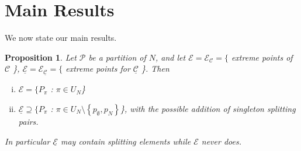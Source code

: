 \documentclass{article}
\newtheorem{prop}{Proposition}
\theoremstyle{case}
\begin{document}
\section{Main Results}
{\parindent0pt %
We now state our main results.\\
}%
\begin{prop} \label{thm0}
Let $\mathcal{P}$ be a partition of $N$, and let $\mathcal{E} = \mathcal{E}_\mathcal{C} = \{$ extreme points of $\mathcal{C}$ \}, $\underline{\mathcal{E}} = \mathcal{E}_{\underline{\mathcal{C}}} = \{$ extreme points for $\underline{\mathcal{C}}$ \}. Then
\begin{enumerate}[(i)]
	\item $\mathcal{E} = \{P_\pi$ : $\pi \in U_N$\}
	\item $\underline{\mathcal{E}} \supseteq \{P_\pi$ : $\pi \in U_N\setminus\left\lbrace p_{\emptyset}, p_N \right\rbrace$\}, with the possible addition of singleton splitting pairs.
\end{enumerate}
In particular $\underline{\mathcal{E}}$ may contain splitting elements while $\mathcal{E}$ never does.
\end{prop}
\end{document}

